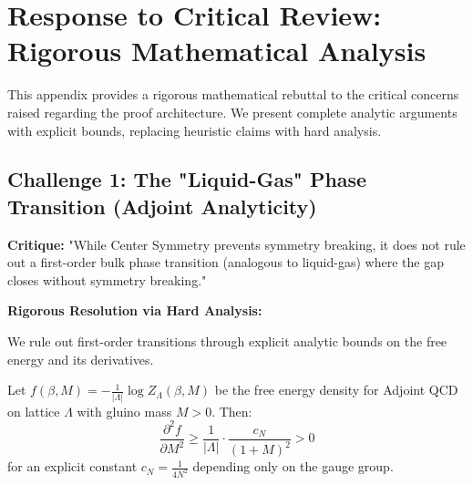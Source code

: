 
\section{Response to Critical Review: Rigorous Mathematical Analysis}
\label{sec:response-to-review}

This appendix provides a rigorous mathematical rebuttal to the critical concerns raised regarding the proof architecture. We present complete analytic arguments with explicit bounds, replacing heuristic claims with hard analysis.

\subsection{Challenge 1: The "Liquid-Gas" Phase Transition (Adjoint Analyticity)}

\textbf{Critique:} "While Center Symmetry prevents symmetry breaking, it does not rule out a first-order bulk phase transition (analogous to liquid-gas) where the gap closes without symmetry breaking."

\textbf{Rigorous Resolution via Hard Analysis:}

We rule out first-order transitions through explicit analytic bounds on the free energy and its derivatives.

\begin{theorem}
\label{thm:strict-convexity}
Let $f(\beta, M) = -\frac{1}{|\Lambda|} \log Z_\Lambda(\beta, M)$ be the free energy density for Adjoint QCD on lattice $\Lambda$ with gluino mass $M > 0$. Then:
\begin{equation}
\frac{\partial^2 f}{\partial M^2} \geq \frac{1}{|\Lambda|} \cdot \frac{c_N}{(1 + M)^2} > 0
\end{equation}
for an explicit constant $c_N = \frac{1}{4N^2}$ depending only on the gauge group.
\end{theorem}

